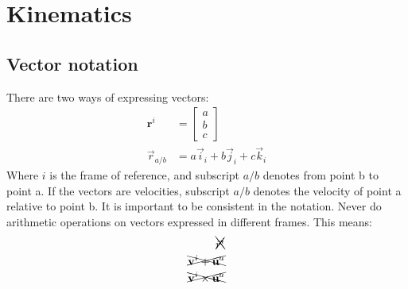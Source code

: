 \section{Kinematics}
\subsection{Vector notation}
There are two ways of expressing vectors:
\begin{subequations}
\begin{align}
    \mathbf{r}^i &= \begin{bmatrix} a \\ b \\ c \end{bmatrix} \\
    \vec{r}_{a/b} &= a\vec{i}_i + b\vec{j}_i + c\vec{k}_i
\end{align}
\end{subequations}
Where $i$ is the frame of reference, and subscript $a/b$ denotes from point b to point a. If the vectors are velocities, subscript $a/b$ denotes the velocity of point a relative to point b.
It is important to be consistent in the notation. Never do arithmetic operations on vectors expressed in different frames. This means: \newline
\begin{subequations}
\begin{align}
    \bcancel{\cancel{\vec{r}^i}}\\
    \bcancel{\cancel{\mathbf{v}^i+\mathbf{u}^a}}\\
    \bcancel{\cancel{\mathbf{v}^i \times \mathbf{u}^a}}
\end{align}
\end{subequations}

